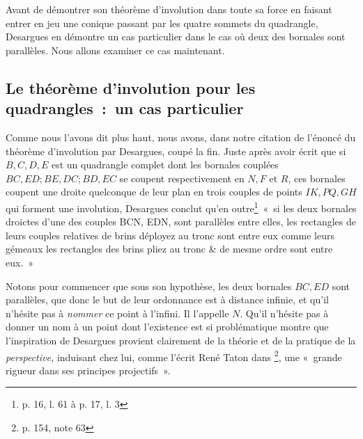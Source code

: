 \documentclass[12pt, a4paper]{article}
\begin{document}
Avant de démontrer son théorème d'involution dans toute sa force en faisant entrer en jeu une conique passant par les quatre sommets du quadrangle, Desargues en démontre un cas particulier dans le cas où deux des bornales sont parallèles. Nous allons examiner ce cas maintenant.  
\subsection{Le théorème d'involution pour les quadrangles~:~un cas particulier}
Comme nous l'avons dit plus haut, nous avons, dans notre citation de l'énoncé du théorème d'involution par Desargues, coupé la fin. Juste après avoir écrit que si $B,C,D,E$ est un quadrangle complet dont les bornales couplées $BC,ED; BE,DC; BD,EC$ se coupent respectivement en $N,F$ et $R$, ces bornales coupent une droite quelconque de leur plan en trois couples de points $IK, PQ, GH$ qui forment une involution, Desargues conclut qu'en outre\footnote{p. 16, l. 61 à p. 17, l. 3}~«~si les deux bornales droictes d'une des couples BCN, EDN, sont parallèles entre elles, les rectangles de leurs couples relatives de brins déployez au tronc sont entre eux comme leurs gémeaux les rectangles des brins pliez au tronc \& de mesme ordre sont entre eux.~»

Notons pour commencer que sous son hypothèse, les deux bornales $BC, ED$ sont parallèles, que donc le but de leur ordonnance est à distance infinie, et qu'il n'hésite pas à \textit{nommer} ce point à l'infini. Il l'appelle $N$. Qu'il n'hésite pas à donner un nom à un point dont l'existence est si problématique montre que l'inspiration de Desargues provient clairement de la théorie et de la pratique de la \textit{perspective,} induisant chez lui, comme l'écrit René Taton dans \cite{taton}\footnote{p. 154, note 63}, une «~grande rigueur dans ses principes projectifs~». 
\end{document}
